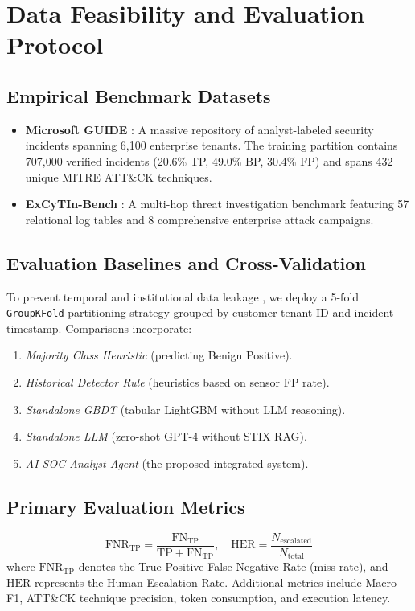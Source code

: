 \section{Data Feasibility and Evaluation Protocol}

\subsection{Empirical Benchmark Datasets}
\begin{itemize}
    \item \textbf{Microsoft GUIDE} \cite{freitas2024cgr}: A massive repository of analyst-labeled security incidents spanning 6,100 enterprise tenants. The training partition contains 707,000 verified incidents (20.6\% TP, 49.0\% BP, 30.4\% FP) and spans 432 unique MITRE ATT\&CK techniques.
    \item \textbf{ExCyTIn-Bench} \cite{wu2026excytin}: A multi-hop threat investigation benchmark featuring 57 relational log tables and 8 comprehensive enterprise attack campaigns.
\end{itemize}

\subsection{Evaluation Baselines and Cross-Validation}
To prevent temporal and institutional data leakage \cite{arp2022dos}, we deploy a 5-fold \texttt{GroupKFold} partitioning strategy grouped by customer tenant ID and incident timestamp. Comparisons incorporate:
\begin{enumerate}
    \item \textit{Majority Class Heuristic} (predicting Benign Positive).
    \item \textit{Historical Detector Rule} (heuristics based on sensor FP rate).
    \item \textit{Standalone GBDT} (tabular LightGBM without LLM reasoning).
    \item \textit{Standalone LLM} (zero-shot GPT-4 without STIX RAG).
    \item \textit{AI SOC Analyst Agent} (the proposed integrated system).
\end{enumerate}

\subsection{Primary Evaluation Metrics}
\begin{equation}
\text{FNR}_{\text{TP}} = \frac{\text{FN}_{\text{TP}}}{\text{TP} + \text{FN}_{\text{TP}}}, \quad \text{HER} = \frac{N_{\text{escalated}}}{N_{\text{total}}}
\end{equation}
where $\text{FNR}_{\text{TP}}$ denotes the True Positive False Negative Rate (miss rate), and $\text{HER}$ represents the Human Escalation Rate. Additional metrics include Macro-F1, ATT\&CK technique precision, token consumption, and execution latency.
